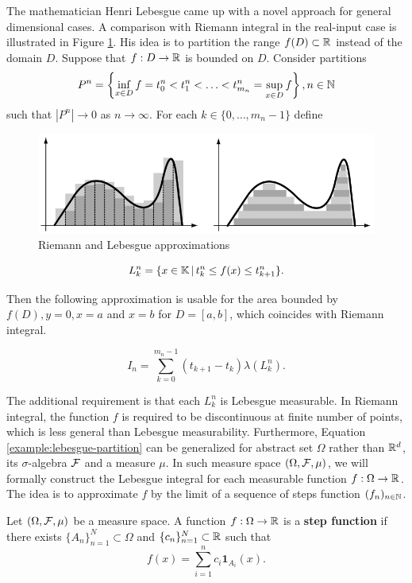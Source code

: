 The mathematician Henri Lebesgue came up with a novel approach for general dimensional cases. A comparison with Riemann integral in the real-input case is illustrated in Figure \ref{figure:schilling}. His idea is to partition the range $f(D)\subset\mathbb{R}$ instead of the domain $D$. Suppose that $f:D\to\mathbb{R}$ is bounded on $D$. Consider partitions $$P^n=\left\{\inf\limits_{x\in D} f=t^n_0<t^n_1<\ldots<t^n_{m_n}=\sup\limits_{x\in D} f\right\}, n\in\mathbb{N}$$ such that $|P^n|\to 0$ as $n\to\infty$. For each $k\in\{0,\ldots,m_n-1\}$ define

\begin{figure}
 \centering
 \includegraphics[width=0.75\linewidth]{img/riemann-vs-lebesgue.png}
 \vspace{0.5cm}
 \caption[Riemann and Lebesgue approximations]{Riemann and Lebesgue approximations \cite{schilling2017measures}}
 \label{figure:schilling}
\end{figure}

$$L_k^n=\{x\in\mathbb{K} \,|\, t_k^n\le f(x)\le t_{k+1}^n\}.$$

Then the following approximation is usable for the area bounded by $f(D), y=0, x=a$ and $x=b$ for $D=[a,b]$, which coincides with Riemann integral.

\begin{equation}
 \label{example:lebesgue-partition}
 I_n=\sum\limits_{k=0}^{m_n-1}(t_{k+1}-t_k)\lambda(L_k^n).
\end{equation}

The additional requirement is that each $L^n_k$ is Lebesgue measurable. In Riemann integral, the function $f$ is required to be discontinuous at finite number of points, which is less general than Lebesgue measurability. Furthermore, Equation \ref{example:lebesgue-partition} can be generalized for abstract set $\Omega$ rather than $\mathbb{R}^d$, its $\sigma$-algebra $\mathcal{F}$ and a measure $\mu$. In such measure space $(\Omega, \mathcal{F}, \mu)$, we will formally construct the Lebesgue integral for each measurable function $f:\Omega\to\mathbb{R}$. The idea is to approximate $f$ by the limit of a sequence of steps function $(f_n)_{n\in\mathbb{N}}$.

\begin{definition}
 Let $(\Omega, \mathcal{F}, \mu)$ be a measure space. A function $f:\Omega\to\mathbb{R}$ is a \textbf{step function} if there exists $\{A_n\}_{n=1}^N\subset\Omega$ and $\{c_n\}_{n=1}^N\subset\mathbb{R}$ such that
 \begin{equation}
  f(x)=\sum\limits_{i=1}^nc_i\mathbf{1}_{A_i}(x).
 \end{equation}
\end{definition}

